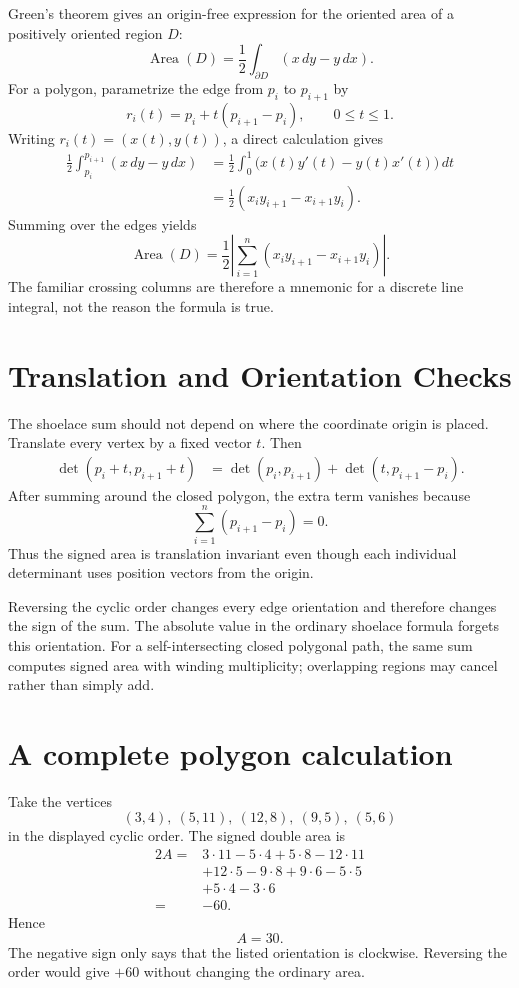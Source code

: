 Green's theorem gives an origin-free expression for the oriented area of a positively oriented region \(D\):
\[
  \operatorname{Area}(D)
  =\frac12\int_{\partial D}(x\,dy-y\,dx).
\]
For a polygon, parametrize the edge from \(p_i\) to \(p_{i+1}\) by
\[
  r_i(t)=p_i+t(p_{i+1}-p_i),
  \qquad 0\le t\le1.
\]
Writing \(r_i(t)=(x(t),y(t))\), a direct calculation gives
\[
\begin{aligned}
  \frac12\int_{p_i}^{p_{i+1}}(x\,dy-y\,dx)
  &=\frac12\int_0^1
  \bigl(x(t)y'(t)-y(t)x'(t)\bigr)\,dt\\
  &=\frac12(x_i y_{i+1}-x_{i+1}y_i).
\end{aligned}
\]
Summing over the edges yields
\[
  \boxed{
  \operatorname{Area}(D)
  =\frac12\left|
  \sum_{i=1}^n(x_i y_{i+1}-x_{i+1}y_i)
  \right|.}
\]
The familiar crossing columns are therefore a mnemonic for a discrete line integral, not the reason the formula is true.

\section{Translation and Orientation Checks}

The shoelace sum should not depend on where the coordinate origin is placed.  Translate every vertex by a fixed vector \(t\).  Then
\[
\begin{aligned}
  \det(p_i+t,p_{i+1}+t)
  &=\det(p_i,p_{i+1})
    +\det(t,p_{i+1}-p_i).
\end{aligned}
\]
After summing around the closed polygon, the extra term vanishes because
\[
  \sum_{i=1}^n(p_{i+1}-p_i)=0.
\]
Thus the signed area is translation invariant even though each individual determinant uses position vectors from the origin.

Reversing the cyclic order changes every edge orientation and therefore changes the sign of the sum.  The absolute value in the ordinary shoelace formula forgets this orientation.  For a self-intersecting closed polygonal path, the same sum computes signed area with winding multiplicity; overlapping regions may cancel rather than simply add.

\section{A complete polygon calculation}

Take the vertices
\[
  (3,4),\ (5,11),\ (12,8),\ (9,5),\ (5,6)
\]
in the displayed cyclic order.  The signed double area is
\[
\begin{aligned}
  2A={}&3\cdot11-5\cdot4
      +5\cdot8-12\cdot11\\
      &+12\cdot5-9\cdot8
      +9\cdot6-5\cdot5\\
      &+5\cdot4-3\cdot6\\
  ={}&-60.
\end{aligned}
\]
Hence
\[
  A=30.
\]
The negative sign only says that the listed orientation is clockwise.  Reversing the order would give \(+60\) without changing the ordinary area.

